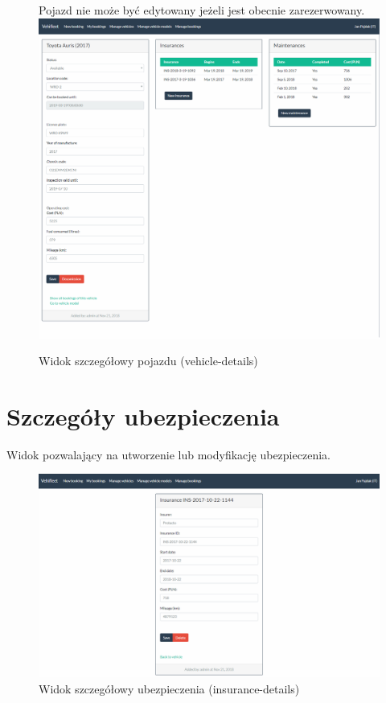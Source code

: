 \documentclass[eng,printmode,openany]{mgr}
\begin{document}
\begin{appendices}
\begin{figure}[H]
			Pojazd nie może być edytowany jeżeli jest obecnie zarezerwowany.
			\centering
			\includegraphics[width=\textwidth]{images/views/vehicle-detail.png}
			\caption{Widok szczegółowy pojazdu (vehicle-details)}
		\end{figure}
		
		\newpage
		\section{Szczegóły ubezpieczenia}
		Widok pozwalający na utworzenie lub modyfikację ubezpieczenia.
		\begin{figure}[H]
			\centering
			\includegraphics[scale=0.32]{images/views/insurance-detail.png}
			\caption{Widok szczegółowy ubezpieczenia (insurance-details)}
		\end{figure}
		

\end{appendices}
\end{document}
